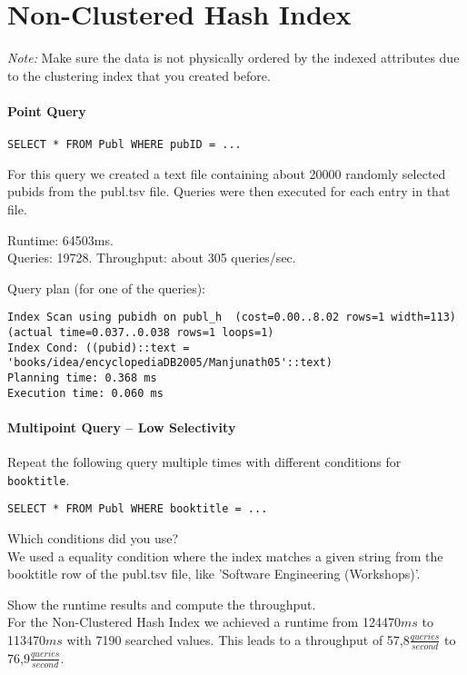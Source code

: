 \documentclass[11pt]{scrartcl}
\begin{document}
\section{Non-Clustered Hash Index}

\noindent \emph{Note:} Make sure the data is not physically ordered by
the indexed attributes due to the clustering index that you created
before.

\paragraph{Point Query}

{\small
\begin{verbatim}
SELECT * FROM Publ WHERE pubID = ...
\end{verbatim}
}

\noindent
For this query we created a text file containing about 20000 randomly selected pubids from the publ.tsv file. Queries were then executed for each entry in that file.

\smallskip\noindent
Runtime: 64503ms. \\
Queries: 19728.
Throughput: about 305 queries/sec.

\smallskip\noindent
Query plan (for one of the queries):
{\small
\begin{verbatim}
Index Scan using pubidh on publ_h  (cost=0.00..8.02 rows=1 width=113) (actual time=0.037..0.038 rows=1 loops=1)
Index Cond: ((pubid)::text = 'books/idea/encyclopediaDB2005/Manjunath05'::text)
Planning time: 0.368 ms
Execution time: 0.060 ms
\end{verbatim}
}


\paragraph{Multipoint Query -- Low Selectivity}

Repeat the following query multiple times with different conditions for {\tt booktitle}.

{\small
\begin{verbatim}
SELECT * FROM Publ WHERE booktitle = ...
\end{verbatim}
}

\noindent
Which conditions did you use?\\
We used a equality condition where the index matches a given string from the booktitle row of the publ.tsv file, like 'Software Engineering (Workshops)'.

\smallskip\noindent
Show the runtime results and compute the throughput.\\
For the Non-Clustered Hash Index we achieved a runtime from 124470$ms$ to 113470$ms$ with 7190 searched values.
This leads to a throughput of 57,8$\frac{queries}{second}$ to 76,9$\frac{queries}{second}$.\\
\end{document}
